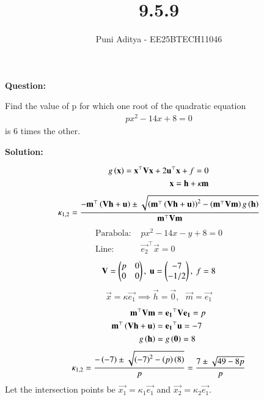 \documentclass[journal]{IEEEtran}
\begin{document}
\title{9.5.9}
\author{Puni Aditya - EE25BTECH11046}
\maketitle

\textbf{Question:}

Find the value of p for which one root of the quadratic equation 
\begin{align*}
    px^2 - 14x + 8 = 0
\end{align*}
is 6 times the other.

\textbf{Solution:}

\begin{align*}
    g\left(\mathbf{x}\right) = \mathbf{x}^\top\mathbf{V}\mathbf{x} + 2\mathbf{u}^\top\mathbf{x} + f = 0 \\
    \mathbf{x} = \mathbf{h} + \kappa\mathbf{m}
\end{align*}
\begin{align}
    \kappa_{1,2} = \frac{-\mathbf{m}^\top\left(\mathbf{V}\mathbf{h}+\mathbf{u}\right) \pm \sqrt{\left(\mathbf{m}^\top\left(\mathbf{V}\mathbf{h}+\mathbf{u}\right)\right)^2 - \left(\mathbf{m}^\top\mathbf{V}\mathbf{m}\right)g\left(\mathbf{h}\right)}}{\mathbf{m}^\top\mathbf{V}\mathbf{m}}
\end{align}
\begin{align*}
    \text{Parabola: } &px^2 - 14x - y + 8 = 0 \\
    \text{Line: } &\vec{e_2}^\top\vec{x} = 0
\end{align*}
\begin{align}
    \mathbf{V} = \begin{pmatrix}p & 0 \\ 0 & 0\end{pmatrix}, \text{ } \mathbf{u} = \begin{pmatrix}-7 \\ -1/2\end{pmatrix}, \text{ } f = 8
\end{align}
\begin{align}
    \vec{x} = \kappa\vec{e_1} \implies \vec{h} = \vec{0}, \text{ } \vec{m} = \vec{e_1}
\end{align}
\begin{align}
    \mathbf{m}^\top\mathbf{V}\mathbf{m} &= \mathbf{e_1}^\top\mathbf{V}\mathbf{e_1} = p \\
    \mathbf{m}^\top\left(\mathbf{V}\mathbf{h} + \mathbf{u}\right) &= \mathbf{e_1}^\top\mathbf{u} = -7 \\
    g\left(\mathbf{h}\right) &= g\left(\mathbf{0}\right) = 8
\end{align}
\begin{align}
    \kappa_{1,2} = \frac{-\left(-7\right) \pm \sqrt{\left(-7\right)^2 - \left(p\right)\left(8\right)}}{p} = \frac{7 \pm \sqrt{49-8p}}{p}
\end{align} 
Let the intersection points be $\vec{x_1} = \kappa_1\vec{e_1}$ and $\vec{x_2} = \kappa_2\vec{e_1}$.
\end{document}

